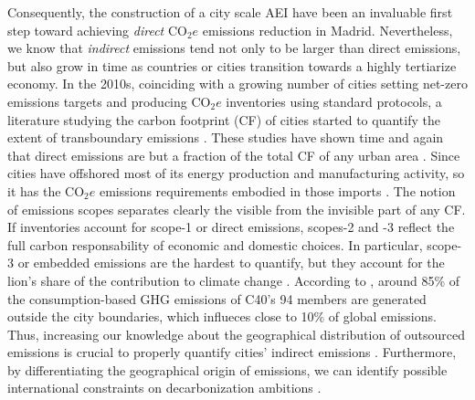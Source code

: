 \documentclass[
  10pt,
  twocolumn]{aft}
\begin{document}
Consequently, the construction of a city scale AEI have been an
invaluable first step toward achieving \emph{direct} \(\text{CO}_2e\)
emissions reduction in Madrid. Nevertheless, we know that
\emph{indirect} emissions tend not only to be larger than direct
emissions, but also grow in time as countries or cities transition
towards a highly tertiarize economy. In the 2010s, coinciding with a
growing number of cities setting net-zero emissions targets and
producing \(\text{CO}_2e\) inventories using standard protocols, a
literature studying the carbon footprint (CF) of cities started to
quantify the extent of transboundary emissions
\citep{wiedmann_city_2021}. These studies have shown time and again that
direct emissions are but a fraction of the total CF of any urban area
\citep{wiedmann_threescope_2021, wiedmann_city_2021, c40_future_2019, eea_environmental_2013}.
Since cities have offshored most of its energy production and
manufacturing activity, so it has the \(\text{CO}_2e\) emissions
requirements embodied in those imports \citep{wiedmann_threescope_2021}.
The notion of emissions scopes separates clearly the visible from the
invisible part of any CF. If inventories account for scope-1 or direct
emissions, scopes-2 and -3 reflect the full carbon responsability of
economic and domestic choices. In particular, scope-3 or embedded
emissions are the hardest to quantify, but they account for the lion's
share of the contribution to climate change
\citep{creutzig_demand-side_2022, wiedmann_city_2021, chen_urban_2020, moran_carbon_2018, ivanova_mapping_2017, wiedmann_concept_2016, kennedy_egregious_2014}.
According to \citet[p.~16]{c40_future_2019}, around 85\% of the
consumption-based GHG emissions of C40's 94 members are generated
outside the city boundaries, which influeces close to 10\% of global
emissions. Thus, increasing our knowledge about the geographical
distribution of outsourced emissions is crucial to properly quantify
cities' indirect emissions
\citep{wiedmann_threescope_2021, eea_environmental_2013}. Furthermore,
by differentiating the geographical origin of emissions, we can identify
possible international constraints on decarbonization ambitions
\citep{remond-tiedrez_eu_2019}.
\end{document}
